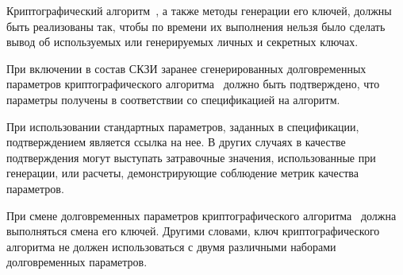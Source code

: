 \label{R.CS.Timing}
Криптографический алгоритм~,
а также методы генерации его ключей, должны быть реализованы так,
чтобы по времени их выполнения нельзя было сделать вывод об
используемых или генерируемых личных и секретных ключах.

\label{R.CS.ValPar}
При включении в состав СКЗИ заранее сгенерированных долговременных параметров 
криптографического алгоритма~ должно быть подтверждено, 
что параметры получены в соответствии со спецификацией на алгоритм.

\begin{note}
При использовании стандартных параметров, заданных в 
спецификации, подтверждением является ссылка на нее. 
%
В других случаях в качестве подтверждения могут выступать
затравочные значения, использованные при генерации,
или расчеты, демонстрирующие соблюдение метрик качества параметров.
\end{note}

\label{R.CS.ChangePar}
При смене долговременных параметров криптографического
алгоритма~ должна выполняться смена его ключей. Другими
словами, ключ криптографического алгоритма не должен использоваться с двумя
различными наборами долговременных параметров.

